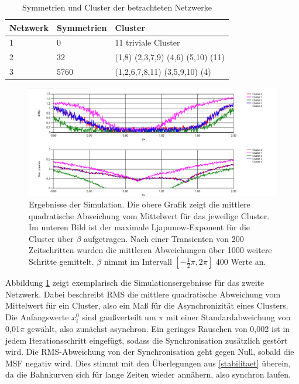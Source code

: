 \begin{table}[]
	\begin{center}
		\caption{Symmetrien und Cluster der betrachteten Netzwerke}
		\label{tab:netzwerke} 
		
		\begin{tabular}{lll}
			Netzwerk & Symmetrien & Cluster                           \\
			\hline
			1        & 0          & 11 triviale Cluster               \\
			2        & 32         & (1,8) (2,3,7,9) (4,6) (5,10) (11) \\
			3        & 5760       & (1,2,6,7,8,11) (3,5,9,10) (4) \\  
			\hline
		\end{tabular}
	\end{center}
\end{table}
\begin{figure}
	\centering
	\includegraphics[width=1.0\textwidth]{abb/misc/ljapResult.png}
	\caption{Ergebnisse der Simulation. Die obere Grafik zeigt die mittlere quadratische Abweichung vom Mittelwert für das jeweilige Cluster. Im unteren Bild ist der maximale Ljapunow-Exponent für die Cluster über $\beta$ aufgetragen. Nach einer Transienten von 200 Zeitschritten wurden die mittleren Abweichungen über 1000 weitere Schritte gemittelt. $\beta$ nimmt im Intervall $[-\frac{1}{2}\pi,2\pi]$ 400 Werte an.}
	\label{fig:ljapResult}
\end{figure}
Abbildung \ref{fig:ljapResult} zeigt exemplarisch die Simulationsergebnisse für das zweite Netzwerk. Dabei beschreibt RMS die mittlere quadratische Abweichung vom Mittelwert für ein Cluster, also ein Maß für die Asynchronizität eines Clusters. Die Anfangswerte $x_i^0$ sind gaußverteilt um $\pi$ mit einer Standardabweichung von 0,01$\pi$ gewählt, also zunächst asynchron. Ein geringes Rauschen von 0,002 ist in jedem Iterationsschritt eingefügt, sodass die Synchronisation zusätzlich gestört wird.
Die RMS-Abweichung von der Synchronisation geht gegen Null, sobald die MSF negativ wird. Dies stimmt mit den Überlegungen aus \ref{stabilitaet} überein, da die Bahnkurven sich für lange Zeiten wieder annähern, also synchron laufen.
